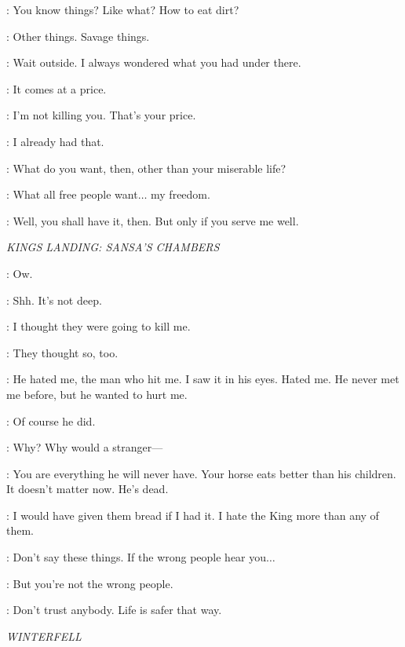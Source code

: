 \THEON: You know things? Like what? How to eat dirt? 

\OSHA: Other things. Savage things.


\THEON:  Wait outside.  I always wondered what you had under there. 

\OSHA: It comes at a price. 

\THEON: I'm not killing you. That's your price. 

\OSHA: I already had that. 

\THEON: What do you want, then, other than your miserable life? 

\OSHA: What all free people want$\ldots$ my freedom. 

\THEON: Well, you shall have it, then. But only if you serve me well. 


\scene

\textit{KINGS LANDING: SANSA'S CHAMBERS}


\SANSA: Ow. 

\SHAE: Shh. It's not deep. 

\SANSA: I thought they were going to kill me. 

\SHAE: They thought so, too. 

\SANSA: He hated me, the man who hit me. I saw it in his eyes. Hated me. He never met me before, but he wanted to hurt me. 

\SHAE: Of course he did. 

\SANSA: Why? Why would a stranger---

\SHAE: You are everything he will never have. Your horse eats better than his children. It doesn't matter now. He's dead. 

\SANSA: I would have given them bread if I had it. I hate the King more than any of them. 

\SHAE: Don't say these things. If the wrong people hear you$\ldots$ 

\SANSA: But you're not the wrong people. 

\SHAE: Don't trust anybody. Life is safer that way. 


\scene

\textit{WINTERFELL} 


